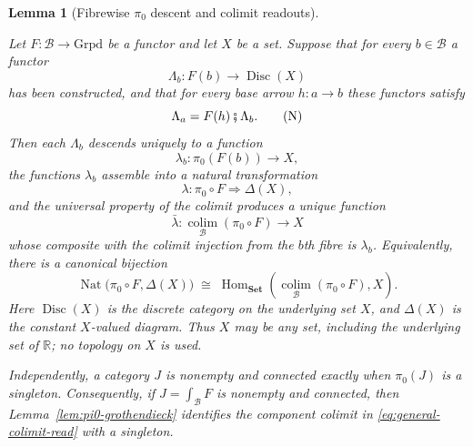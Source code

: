 \documentclass[11pt]{article}
\newcommand{\RR}{\mathbb{R}}
\providecommand{\Grpd}{\mathrm{Grpd}}
\providecommand{\lean}[1]{}
\theoremstyle{plain}
\newtheorem{lemma}[theorem]{Lemma}
\theoremstyle{definition}
\theoremstyle{remark}
\begin{document}
\begin{lemma}[Fibrewise $\pi_0$ descent and colimit readouts]\label{lem:connected-readout}
\lean{CategoryTheory.ConnectedComponents.typeToCatHomEquiv,
CategoryTheory.Limits.colimit.desc,
CategoryTheory.Limits.colimit.ι_desc}
Let $F:\mathcal B\to\Grpd$ be a functor and let $X$ be a set. Suppose that
for every $b\in\mathcal B$ a functor
\[
  \Lambda_b:F(b)\longrightarrow\operatorname{Disc}(X)
                                                        \tag{D}\label{eq:fibre-discrete-read}
\]
has been constructed, and that for every base arrow $h:a\to b$ these
functors satisfy
\[
  \Lambda_a=F(h)\fatsemi\Lambda_b.                    \tag{N}\label{eq:fibre-read-naturality-hyp}
\]
Then each $\Lambda_b$ descends uniquely to a function
\[
  \lambda_b:\pi_0(F(b))\longrightarrow X,
\]
the functions $\lambda_b$ assemble into a natural transformation
\[
  \lambda:\pi_0\circ F\Longrightarrow\Delta(X),       \tag{$\lambda$}\label{eq:general-component-read}
\]
and the universal property of the colimit produces a unique function
\[
  \bar\lambda:
  \operatorname*{colim}_{\mathcal B}(\pi_0\circ F)
  \longrightarrow X                                  \tag{$\bar\lambda$}\label{eq:general-colimit-read}
\]
whose composite with the colimit injection from the $b$th fibre is
$\lambda_b$. Equivalently, there is a canonical bijection
\[
 \operatorname{Nat}\bigl(\pi_0\circ F,\Delta(X)\bigr)
 \;\cong\;
 \operatorname{Hom}_{\mathbf{Set}}
 \!\left(\operatorname*{colim}_{\mathcal B}(\pi_0\circ F),X\right).
                                                        \tag{U}\label{eq:component-colimit-universal}
\]
Here $\operatorname{Disc}(X)$ is the discrete category on the underlying
set $X$, and $\Delta(X)$ is the constant $X$-valued diagram. Thus $X$ may
be any set, including the underlying set of $\RR$; no topology on $X$ is
used.

Independently, a category $J$ is nonempty and connected exactly when
$\pi_0(J)$ is a singleton. Consequently, if
$J=\int_{\mathcal B}F$ is nonempty and connected, then
Lemma~\ref{lem:pi0-grothendieck} identifies the component colimit in
\eqref{eq:general-colimit-read} with a singleton.
\end{lemma}
\end{document}
